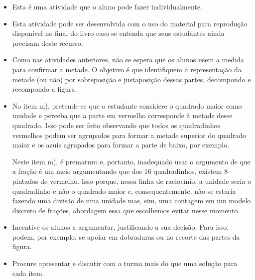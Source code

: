 \documentclass[10 pt,usenames,dvipsnames, oneside]{article}
\begin{document}
\begin{goals}
\begin{enumerate}
\end{enumerate}
\tcblower
\tikzset{x=1cm, y=1cm}
\begin{itemize} %
\item Esta é uma atividade que o aluno pode fazer individualmente.
\item Esta atividade pode ser desenvolvida com o uso do material para reprodução disponível no final do livro caso se entenda que seus estudantes ainda precisam deste recurso.
\item Como nas atividades anteriores, não se espera que os alunos usem a medida para confirmar a metade. O objetivo é que identifiquem a representação da metade (ou não) por sobreposição e justaposição dessas partes, decompondo e recompondo a figura.
\item No item m), pretende-se que o estudante considere o quadrado maior como unidade e perceba que a parte em vermelho corresponde à metade desse quadrado. Isso pode ser feito observando que todos os quadradinhos vermelhos podem ser agrupados para formar a metade superior do quadrado maior e os azuis agrupados para formar a parte de baixo, por exemplo.
\begin{center}
\quad
{}
\end{center}

Neste item m), é prematuro e, portanto, inadequado usar o argumento de que a fração é um meio argumentando que dos 16 quadradinhos, existem 8 pintados de vermelho. Isso porque, nessa linha de raciocínio, a unidade seria o quadradinho e não o quadrado maior e, consequentemente, não se estaria fazendo uma divisão de uma unidade mas, sim, uma contagem em um modelo discreto de frações, abordagem essa que escolhemos evitar nesse momento.   


\item Incentive os alunos a argumentar, justificando a sua decisão. Para isso, podem, por exemplo, se apoiar em dobraduras ou no recorte das partes da figura.
\item Procure apresentar e discutir com a turma mais do que uma solução para cada item.
\end{itemize} %


\end{goals}
\end{document}
